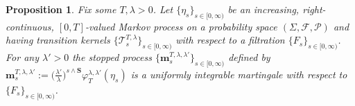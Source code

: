 \documentclass[10pt]{article}
\numberwithin{equation}{section}
\newtheorem{proposition}[theorem]{Proposition}
\theoremstyle{definition}
\begin{document}
 
\begin{proposition} \label{PropMartEta} Fix some $T,\lambda>0$. Let  $\{ \eta_s \}_{s\in [0,\infty)}$ be an increasing, right-continuous,  $[0,T]$-valued Markov process on a probability space  $(\Sigma, \mathcal{F},\mathcal{P})$ and having transition kernels $\{ \mathscr{T}^{T,\lambda}_s \}_{s\in [0,\infty)}  $ with respect to a filtration $\{ F_s\}_{s\in [0,\infty)}$.  For any $\lambda' >0$ the stopped process $\{ \mathbf{m}_s^{T,\lambda,\lambda'}\}_{s\in [0,\infty)  }$ defined by $ \mathbf{m}_s^{T,\lambda,\lambda'}:= \big(\frac{\lambda'}{\lambda}\big)^{s\wedge \mathbf{S}} \varphi_T^{\lambda,\lambda'}( \eta_s)$  is a uniformly integrable martingale with respect to $\{ F_s\}_{s\in [0,\infty)}$.
\end{proposition}
\end{document}
